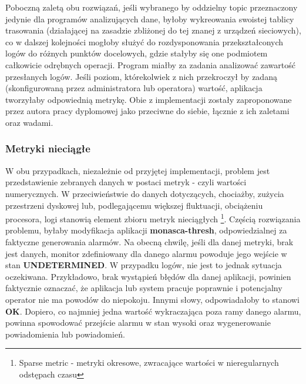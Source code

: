     Poboczną zaletą obu rozwiązań, jeśli wybranego by oddzielny topic przeznaczony jedynie dla programów analizujących dane, byłoby wykreowania
    swoistej tablicy trasowania (działającej na zasadzie zbliżonej do tej znanej z urządzeń sieciowych), co w dalszej kolejności mogłoby
    służyć do rozdysponowania przekształconych logów do różnych punktów docelowych, gdzie stałyby się one podmiotem całkowicie odrębnych operacji.
    Program miałby za zadania analizować zawartość przesłanych logów. Jeśli poziom, którekolwiek z nich przekroczył by zadaną (skonfigurowaną przez
    administratora lub operatora) wartość, aplikacja tworzyłaby odpowiednią metrykę.
    Obie z implementacji zostały zaproponowane przez autora pracy dyplomowej jako przeciwne do siebie, łącznie z ich zaletami oraz wadami.

    \subsubsection{Metryki nieciągłe}
    W obu przypadkach, niezależnie od przyjętej implementacji, problem jest przedstawienie zebranych danych w postaci metryk - czyli wartości
    numerycznych. W przeciwieństwie do danych dotyczących, chociażby, zużycia przestrzeni dyskowej lub, podlegającemu większej
    fluktuacji, obciążeniu procesora, logi stanowią element zbioru metryk nieciągłych \footnote{Sparse metric - metryki okresowe,
    zwracające wartości w nieregularnych odstępach czasu}. Częścią rozwiązania problemu, byłaby modyfikacja aplikacji \textbf{monasca-thresh},
    odpowiedzialnej za faktyczne generowania alarmów. Na obecną chwilę, jeśli dla danej metryki, brak jest danych, monitor zdefiniowany
    dla danego alarmu powoduje jego wejście w stan \textbf{UNDETERMINED}. W przypadku logów, nie jest to jednak sytuacja oczekiwana. 
    Przykładowo, brak wystąpień błędów dla danej aplikacji, powinien faktycznie oznaczać, że aplikacja lub system pracuje poprawnie i
    potencjalny operator nie ma powodów do niepokoju. Innymi słowy, odpowiadałoby to stanowi \textbf{OK}. Dopiero, co najmniej jedna wartość
    wykraczająca poza ramy danego alarmu, powinna spowodować przejście alarmu w stan wysoki oraz wygenerowanie powiadomienia lub powiadomień.